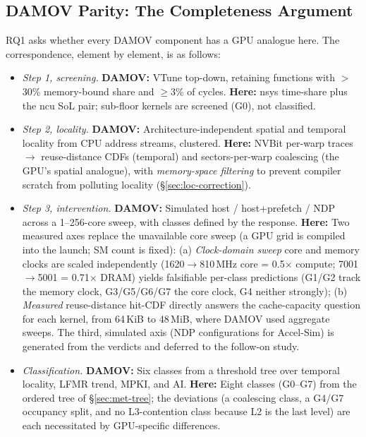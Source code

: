 \subsection{DAMOV Parity: The Completeness Argument}
\label{sec:met-parity}

RQ1 asks whether every DAMOV component has a GPU analogue here. The correspondence, element by element, is as follows:

\begin{itemize}
    \item \emph{Step 1, screening.} \textbf{DAMOV:} VTune top-down, retaining functions with $>$30\% memory-bound share and $\geq$3\% of cycles. \textbf{Here:} nsys time-share plus the ncu SoL pair; sub-floor kernels are screened (G0), not classified.

    \item \emph{Step 2, locality.} \textbf{DAMOV:} Architecture-independent spatial and temporal locality from CPU address streams, clustered. \textbf{Here:} NVBit per-warp traces $\rightarrow$ reuse-distance CDFs (temporal) and sectors-per-warp coalescing (the GPU's spatial analogue), with \emph{memory-space filtering} to prevent compiler scratch from polluting locality (\S\ref{sec:loc-correction}).

    \item \emph{Step 3, intervention.} \textbf{DAMOV:} Simulated host / host+prefetch / NDP across a 1--256-core sweep, with classes defined by the response. \textbf{Here:} Two measured axes replace the unavailable core sweep (a GPU grid is compiled into the launch; SM count is fixed): (a) \emph{Clock-domain sweep} core and memory clocks are scaled independently (1620$\rightarrow$810\,MHz core = 0.5$\times$ compute; 7001$\rightarrow$5001 = 0.71$\times$ DRAM) yields falsifiable per-class predictions (G1/G2 track the memory clock, G3/G5/G6/G7 the core clock, G4 neither strongly); (b) \emph{Measured} reuse-distance hit-CDF directly answers the cache-capacity question for each kernel, from 64\,KiB to 48\,MiB, where DAMOV used aggregate sweeps. The third, simulated axis (NDP configurations for Accel-Sim) is generated from the verdicts and deferred to the follow-on study.

    \item \emph{Classification.} \textbf{DAMOV:} Six classes from a threshold tree over temporal locality, LFMR trend, MPKI, and AI. \textbf{Here:} Eight classes (G0--G7) from the ordered tree of \S\ref{sec:met-tree}; the deviations (a coalescing class, a G4/G7 occupancy split, and no L3-contention class because L2 is the last level) are each necessitated by GPU-specific differences.


\end{itemize}
